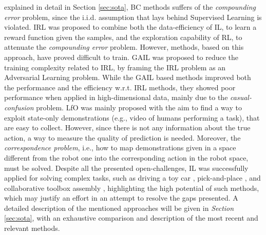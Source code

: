 explained in detail in Section \ref{sec:sota}, BC methods suffers of the \textit{compounding error} problem, since the
i.i.d. assumption that lays behind Supervised Learning is violated. IRL was proposed to combine both the
data-efficiency of IL, to learn a reward function given the samples, and the exploration capability of RL, to attenuate
the \textit{compounding error} problem. However, methods, based on this approach, have proved difficult to train. GAIL was proposed to reduce
the training complexity related to IRL, by framing the IRL problem as an Adversarial Learning problem. While the GAIL based methods 
improved both the performance and the efficiency w.r.t. IRL methods, they showed poor performance when applied in
high-dimensional data, mainly due to the \textit{casual-confusion} problem. LfO was mainly proposed with
the aim to find a way to exploit state-only demonstrations (e.g., video of humans performing a task), that are easy to collect. However, since
there is not any information about the true action, a way to measure the quality of prediction is needed. Moreover, the
\textit{correspondence problem}, i.e., how to map demonstrations given in a space different from the robot one into the corresponding action in the robot space, must be solved.    
\newline Despite all the presented open-challenges, IL was successfully applied for solving complex tasks, such as
driving a toy car \cite{codevilla2018end_to_end}, pick-and-place \cite{zhang2018deep_vr_teleoperation}, and collaborative toolbox
assembly \cite{maeda2017probabilistic}, highlighting the high potential of such methods, which may justify an effort in
an attempt to resolve the gaps presented. A detailed description of the mentioned approaches will be given in
\textit{Section} \ref{sec:sota}, with an exhaustive comparison and description of the most recent and relevant methods.


